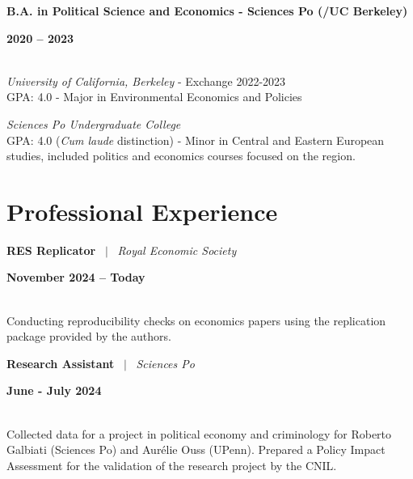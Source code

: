 \documentclass[a4paper,11pt]{article}
\begin{document}
\noindent
\begin{minipage}[t]{0.7\textwidth}
  \textbf{B.A. in Political Science and Economics - Sciences Po (/UC Berkeley)}
\end{minipage}%
\begin{minipage}[t]{0.3\textwidth}
  \raggedleft \textbf{2020 -- 2023}
\end{minipage}
\\
\textit{University of California, Berkeley} - Exchange 2022-2023 \\
GPA: 4.0  - Major in Environmental Economics and Policies

\textit{Sciences Po Undergraduate College}\\
GPA: 4.0 (\textit{Cum laude} distinction) - Minor in Central and Eastern European studies, included politics and economics courses focused on the region. 




\section{Professional Experience}

\noindent
\newline
\begin{minipage}[t]{0.7\textwidth}
  \textbf{RES Replicator} \ $|$ \ \textit{Royal Economic Society}
\end{minipage}%
\begin{minipage}[t]{0.3\textwidth}
  \raggedleft \textbf{November 2024 -- Today}
\end{minipage}
\\
Conducting reproducibility checks on economics papers using the replication package provided by the authors.

\noindent
\begin{minipage}[t]{0.7\textwidth}
  \textbf{Research Assistant} \ $|$ \ \textit{Sciences Po}
\end{minipage}%
\begin{minipage}[t]{0.3\textwidth}
  \raggedleft \textbf{June - July 2024}
\end{minipage}
\\
Collected data for a project in political economy and criminology for Roberto Galbiati (Sciences Po) and Aurélie Ouss (UPenn). Prepared a Policy Impact Assessment for the validation of the research project by the CNIL.
\end{document}
